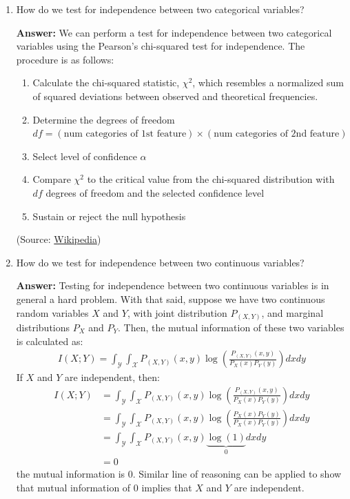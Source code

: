 \documentclass{article}
\newenvironment{QandA}{\begin{enumerate}[label=\arabic*.]}{\end{enumerate}}
\newenvironment{InnerQandA}{\begin{enumerate}[label=\roman*.]}{\end{enumerate}}
\newenvironment{answer}{\par\normalfont \textbf{Answer:}}{}
\begin{document}
\begin{QandA}
\begin{InnerQandA}
        \item How do we test for independence between two categorical variables?
        \begin{answer}
            We can perform a test for independence between two categorical variables using the Pearson's chi-squared test for independence. The procedure is as follows:
            \begin{enumerate}[label={\arabic*.}]
                \item Calculate the chi-squared statistic, $\chi^2$, which resembles a normalized sum of squared deviations between observed and theoretical frequencies. 
                \item Determine the degrees of freedom $df = (\text{num categories of 1st feature}) \times (\text{num categories of 2nd feature})$
                \item Select level of confidence $\alpha$
                \item Compare $\chi^2$ to the critical value from the chi-squared distribution with $df$ degrees of freedom and the selected confidence level
                \item Sustain or reject the null hypothesis
            \end{enumerate}
            (Source: \href{https://en.wikipedia.org/wiki/Pearson%27s_chi-squared_test}{Wikipedia})
        \end{answer}

        \item How do we test for independence between two continuous variables?
        \begin{answer}
            Testing for independence between two continuous variables is in general a hard problem. With that said, suppose we have two continuous random variables $X$ and $Y$, with joint distribution $P_{(X, Y)}$, and marginal distributions $P_X$ and $P_Y$. Then, the mutual information of these two variables is calculated as:
            \begin{align*}
                I(X; Y) = \int_{\mathcal{Y}} \int_{\mathcal{X}} P_{(X, Y)} (x, y) \log \left( \frac{P_{(X, Y)} (x, y)}{P_X(x) P_Y(y)} \right) dx dy
            \end{align*}
            If $X$ and $Y$ are independent, then:
            \begin{align*}
                I(X; Y) &= \int_{\mathcal{Y}} \int_{\mathcal{X}} P_{(X, Y)} (x, y) \log \left( \frac{P_{(X, Y)} (x, y)}{P_X(x) P_Y(y)} \right) dx dy \\
                &= \int_{\mathcal{Y}} \int_{\mathcal{X}} P_{(X, Y)} (x, y) \log \left( \frac{P_X(x) P_Y(y)}{P_X(x) P_Y(y)} \right) dx dy \\
                &= \int_{\mathcal{Y}} \int_{\mathcal{X}} P_{(X, Y)} (x, y) \underbrace{\log \left( 1 \right)}_{0} dx dy \\
                &= 0
            \end{align*}
            the mutual information is 0. Similar line of reasoning can be applied to show that mutual information of $0$ implies that $X$ and $Y$ are independent.


\end{answer}
\end{InnerQandA}
\end{QandA}
\end{document}
